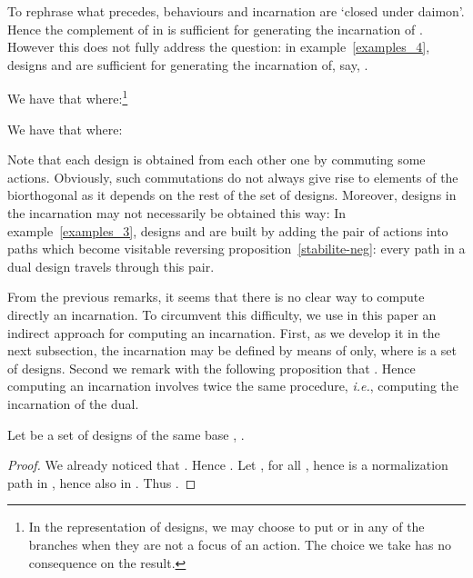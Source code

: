 \documentclass{LMCS}
\def\ie{{\em i.e.}}
\begin{document}
To rephrase what precedes, behaviours and incarnation are `closed under daimon'. Hence the complement  of  in  is sufficient for generating the incarnation of . However this does not fully address the question: in example~\ref{examples_4}, designs  and  are sufficient for generating the incarnation of, say, .
\begin{exa}\label{examples_3}
We have that  where:\footnote{In the representation of designs, we may choose to put  or  in any of the branches when they are not a focus of an action. The choice we take has no consequence on the result.}\\



\end{exa}



\begin{exa}\label{examples_4}
We have that  where:

\end{exa}



Note that each design is obtained from each other one by commuting some actions.
Obviously, such commutations do not always give rise to elements of the biorthogonal as it depends on the rest of the set of designs. Moreover, designs in the incarnation may not necessarily be obtained this way: In example~\ref{examples_3}, designs  and  are built by adding the pair of actions  into paths which become visitable reversing proposition~\ref{stabilite-neg}: every path in a dual design travels through this pair.

\vspace{1em}


\vspace{.5cm}
From the previous remarks, it seems that there is no clear way to compute directly an incarnation. To circumvent this difficulty, we use in this paper an indirect approach for computing an incarnation. 
First, as we develop it in the next subsection, the incarnation  may be defined by means of  only, where  is a set of designs.
Second we remark with the following proposition that . Hence computing an incarnation involves twice the same procedure, \ie, computing the incarnation of the dual.
\begin{prop}\label{prop:charac_incarnation_dualdual}
Let  be a set of designs of the same base ,
.
\end{prop}
\begin{proof}
We already noticed that . Hence .
Let , for all ,  hence  is a normalization path in , hence also in . Thus . 
\end{proof}
\end{document}
